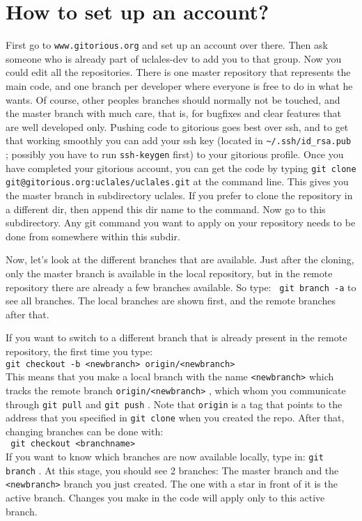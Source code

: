 \documentclass[a4paper,10pt] {article}
\begin{document}
\section{How to set up an account?} 
First go to \verb|www.gitorious.org| and set up an account over there. Then ask someone who is already part of uclales-dev to add you to that group. Now you could edit all the repositories. There is one master repository that represents the main code, and one branch per developer where everyone is free to do in what he wants.
Of course, other peoples branches should normally not be touched, and the master branch with much care, that is, for bugfixes and clear features that are well developed only.
Pushing code to gitorious goes best over ssh, and to get that working smoothly you can add your ssh key (located in   \verb|~/.ssh/id_rsa.pub| ; possibly you have to run \verb|ssh-keygen|  first) to your gitorious profile.
Once you have completed your gitorious account, you can get the code by typing      \verb|git clone git@gitorious.org:uclales/uclales.git|    at the command line. This gives you the master branch in subdirectory uclales. If you prefer to clone the repository in a different dir, then append this dir name to the command. Now go to this subdirectory. Any git command you want to apply on your repository needs to be done from somewhere within this subdir.

Now, let's look at the different branches that are available. Just after the cloning, only the master branch is available in the local repository, but in the remote repository there are already a few branches available. So type:     \verb| git branch -a|    to see all branches. The local branches are shown first, and the remote branches after that.

If you want to switch to a different branch that is already present in the remote repository, the first time you type:  \\
   \verb|git checkout -b <newbranch> origin/<newbranch>| \\
This means that you make a local branch with the name   \verb|<newbranch>|  which tracks the remote branch   \verb|origin/<newbranch>| , which whom you communicate through   \verb|git pull|  and   \verb|git push| . Note that   \verb|origin|  is a tag that points to the address that you specified in   \verb|git clone|  when you created the repo.
After that, changing branches can be done with:  \\
  \verb| git checkout <branchname>|   \\
If you want to know which branches are now available locally, type in:   \verb|git branch| . At this stage, you should see 2 branches: The master branch and the   \verb|<newbranch>|  branch you just created. The one with a star in front of it is the active branch. Changes you make in the code will apply only to this active branch.
\end{document}
